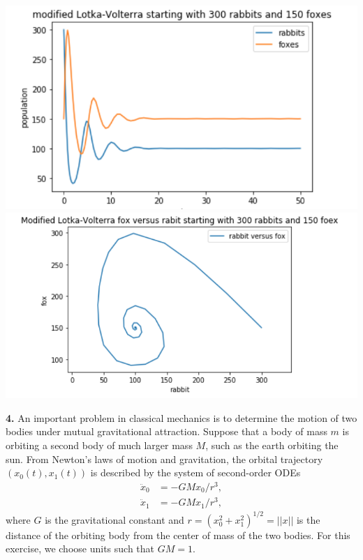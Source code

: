 \documentclass[11pt]{article}
\begin{document}
\includegraphics[scale = 0.65]{33.png}\includegraphics[scale = 0.65]{34.png}

\newpage
{\bf 4.} 
An important problem in classical mechanics is to determine the motion
of two bodies under mutual gravitational attraction.
Suppose that a body of mass $m$ is orbiting a second body of much larger mass $M$,
such as the earth orbiting the sun.
From Newton's laws of motion and gravitation,
the orbital trajectory $(x_0(t), x_1(t))$ is described by the system
of second-order ODEs
\begin{align}
\ddot x_0 &= -GMx_0/r^3, \\
\ddot x_1 &= -GMx_1/r^3, 
\end{align}
where $G$ is the gravitational constant and $r = (x_0^2 + x_1^2)^{1/2} = ||x||$
is the distance of the orbiting body from the center of mass of the two bodies.
For this exercise, we choose units such that $GM=1$.
\end{document}
